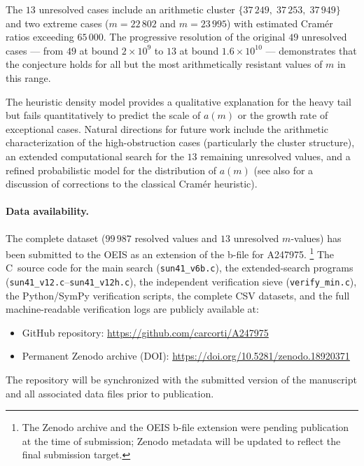 \documentclass[12pt]{article}
\begin{document}
The $13$ unresolved cases include an arithmetic cluster
$\{37\,249,\; 37\,253,\; 37\,949\}$ and two extreme cases
($m = 22\,802$ and $m = 23\,995$) with estimated Cram\'er ratios
exceeding $65\,000$.
The progressive resolution of the original $49$ unresolved cases
--- from $49$ at bound $2 \times 10^9$ to $13$ at bound
$1.6 \times 10^{10}$ --- demonstrates that the conjecture holds for
all but the most arithmetically resistant values of $m$ in this range.

The heuristic density model provides a qualitative explanation for the
heavy tail but fails quantitatively to predict the scale of $a(m)$ or
the growth rate of exceptional cases.
Natural directions for future work include the arithmetic
characterization of the high-obstruction cases (particularly the
cluster structure), an extended
computational search for the $13$ remaining unresolved values, and a
refined probabilistic model for the distribution of $a(m)$
(see also \cite{Granville1995} for a discussion of corrections to
the classical Cram\'er heuristic).

\paragraph{Data availability.}
The complete dataset ($99\,987$ resolved values and $13$ unresolved
$m$-values) has been submitted to the OEIS as an extension of the
b-file for A247975.%
\footnote{The Zenodo archive and the OEIS b-file extension were
pending publication at the time of submission; Zenodo metadata will be
updated to reflect the final submission target.}
The C~source code for the main search (\texttt{sun41\_v6b.c}), the
extended-search programs
(\texttt{sun41\_v12.c}--\texttt{sun41\_v12h.c}), the
independent verification sieve (\texttt{verify\_min.c}), the
Python/SymPy verification scripts, the complete CSV datasets,
and the full machine-readable verification logs are publicly
available at:
\begin{itemize}
  \item GitHub repository: \url{https://github.com/carcorti/A247975}
  \item Permanent Zenodo archive (DOI):
        \url{https://doi.org/10.5281/zenodo.18920371}
\end{itemize}
The repository will be synchronized with the submitted version of the
manuscript and all associated data files prior to publication.
\end{document}
